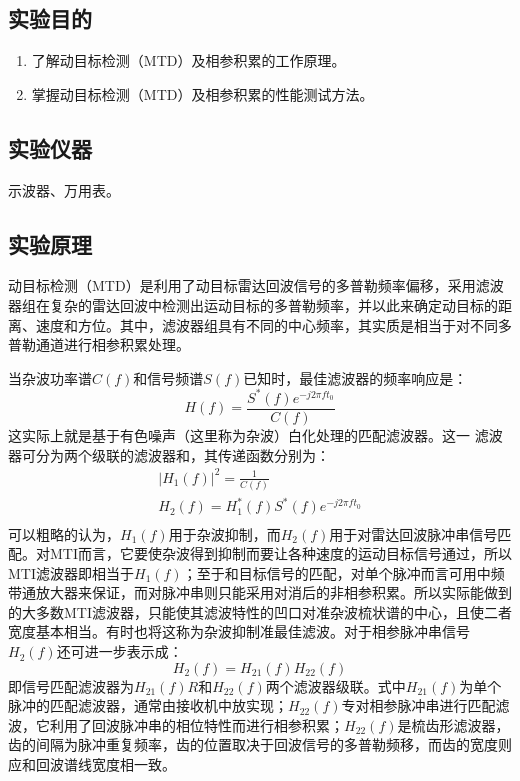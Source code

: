 \documentclass[12pt]{article}
\begin{document}
\subsection{实验目的}
\begin{enumerate}
  \item 了解动目标检测（MTD）及相参积累的工作原理。
\item 掌握动目标检测（MTD）及相参积累的性能测试方法。
\end{enumerate}
\subsection{实验仪器}
示波器、万用表。
\subsection{实验原理}
动目标检测（MTD）是利用了动目标雷达回波信号的多普勒频率偏移，采用滤波器组在复杂的雷达回波中检测出运动目标的多普勒频率，并以此来确定动目标的距离、速度和方位。其中，滤波器组具有不同的中心频率，其实质是相当于对不同多普勒通道进行相参积累处理。\par
当杂波功率谱$C(f)$和信号频谱$S(f)$已知时，最佳滤波器的频率响应是：
\begin{equation}
H(f)=\frac{S^*(f)e^{-j2\pi ft_0}}{C(f)}
\end{equation}
这实际上就是基于有色噪声（这里称为杂波）白化处理的匹配滤波器。这一
滤波器可分为两个级联的滤波器和，其传递函数分别为：
\begin{equation}
\begin{array}{c}
  |H_1(f)|^2=\frac{1}{C(f)} \\
  H_2(f)=H_1^*(f)S^*(f)e^{-j2\pi ft_0}\\
\end{array}
\end{equation}
可以粗略的认为，$H_1(f)$用于杂波抑制，而$H_2(f)$用于对雷达回波脉冲串信号匹配。对MTI而言，它要使杂波得到抑制而要让各种速度的运动目标信号通过，所以MTI滤波器即相当于$H_1(f)$；至于和目标信号的匹配，对单个脉冲而言可用中频带通放大器来保证，而对脉冲串则只能采用对消后的非相参积累。所以实际能做到的大多数MTI滤波器，只能使其滤波特性的凹口对准杂波梳状谱的中心，且使二者宽度基本相当。有时也将这称为杂波抑制准最佳滤波。对于相参脉冲串信号$H_2(f)$还可进一步表示成：
\begin{equation}
H_2(f)=H_{21}(f)H_{22}(f)
\end{equation}
即信号匹配滤波器为$H_{21}(f)R$和$H_{22}(f)$两个滤波器级联。式中$H_{21}(f)$为单个脉冲的匹配滤波器，通常由接收机中放实现；$H_{22}(f)$专对相参脉冲串进行匹配滤波，它利用了回波脉冲串的相位特性而进行相参积累；$H_{22}(f)$是梳齿形滤波器，齿的间隔为脉冲重复频率，齿的位置取决于回波信号的多普勒频移，而齿的宽度则应和回波谱线宽度相一致。\par
\end{document}
